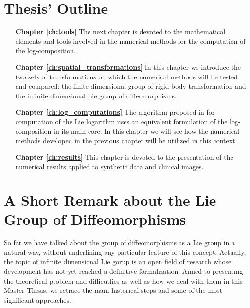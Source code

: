 \section{Thesis' Outline}\label{se:thesis_outline}
\begin{enumerate}
	
	\item[{\bf Chapter \ref{ch:tools}}] The next chapter is devoted to the mathematical elements and tools involved in the numerical methods for the computation of the log-composition.
	
	\item[{\bf Chapter \ref{ch:spatial_transformations}}] In this chapter we introduce the two sets of transformations on which the numerical methods will be tested and compared: the finite dimensional group of rigid body transformation and the infinite dimensional Lie group of diffeomorphisms.

	\item[{\bf Chapter \ref{ch:log_computations}}] The algorithm proposed in \cite{bossa2008algorithms} for computation of the Lie logarithm uses an equivalent formulation of the log-composition in its main core. In this chapter we will see how the numerical methods developed in the previous chapter will be utilized in this context.
  
	\item[{\bf Chapter \ref{ch:results}}] This chapter is devoted to the presentation of the numerical results applied to synthetic data and clinical images. 
	
\end{enumerate}


\section*{A Short Remark about the Lie Group of Diffeomorphisms}

So far we have talked about the group of diffeomorphisms as a Lie group in a natural way, without underlining any particular feature of this concept. Actually, the topic of infinite dimensional Lie gorup is an open field of research whose development has not yet reached a definitive formalization.
Aimed to presenting the theoretical problem and difficutlies as well as how we deal with them in this Master Thesis, we retrace the main historical steps and some of the most significant approaches.

